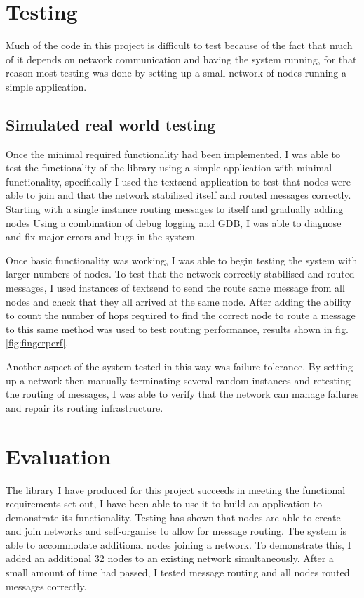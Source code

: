 \documentclass{article}
\begin{document}
\section{Testing}

Much of the code in this project is difficult to test because of the fact that much of it depends on network communication and having the system running, for that reason most testing was done by setting up a small network of nodes running a simple application.

\subsection{Simulated real world testing}

Once the minimal required functionality had been implemented, I was able to test the functionality of the library using a simple application with minimal functionality, specifically I used the textsend application to test that nodes were able to join and that the network stabilized itself and routed messages correctly. Starting with a single instance routing messages to itself and gradually adding nodes Using a combination of debug logging and GDB, I was able to diagnose and fix major errors and bugs in the system.

Once basic functionality was working, I was able to begin testing the system with larger numbers of nodes. To test that the network correctly stabilised and routed messages, I used instances of textsend to send the route same message from all nodes and check that they all arrived at the same node. After adding the ability to count the number of hops required to find the correct node to route a message to this same method was used to test routing performance, results shown in fig. \ref{fig:fingerperf}.

Another aspect of the system tested in this way was failure tolerance. By setting up a network then manually terminating several random instances and retesting the routing of messages, I was able to verify that the network can manage failures and repair its routing infrastructure.

\section{Evaluation}


The library I have produced for this project succeeds in meeting the functional requirements set out, I have been able to use it to build an application to demonstrate its functionality. Testing has shown that nodes are able to create and join networks and self-organise to allow for message routing. 
The system is able to accommodate additional nodes joining a network. To demonstrate this, I added an additional 32 nodes to an existing network simultaneously. After a small amount of time had passed, I tested message routing and all nodes routed messages correctly.
\end{document}
